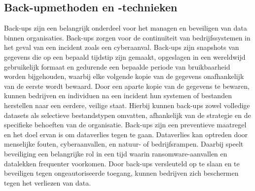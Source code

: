 \subsection{Back-upmethoden en -technieken}
Back-ups zijn een belangrijk onderdeel voor het managen en beveiligen van data binnen organisaties. Back-ups zorgen voor de continuïteit van bedrijfssystemen in het geval van een incident zoals een cyberaanval. Back-ups zijn snapshots van gegevens die op een bepaald tijdstip zijn gemaakt, opgeslagen in een wereldwijd gebruikelijk formaat en gedurende een bepaalde periode van bruikbaarheid worden bijgehouden, waarbij elke volgende kopie van de gegevens onafhankelijk van de eerste wordt bewaard\autocite{Nelson2011}. Door een aparte kopie van de gegevens te bewaren, kunnen bedrijven en individuen na een incident hun systemen of bestanden herstellen naar een eerdere, veilige staat. Hierbij kunnen back-ups zowel volledige datasets als selectieve bestandstypen omvatten, afhankelijk van de strategie en de specifieke behoeften van de organisatie. Back-ups zijn een preventieve maatregel en het doel ervan is om dataverlies tegen te gaan. Dataverlies kan optreden door menselijke fouten, cyberaanvallen, en natuur- of bedrijfsrampen. Daarbij speelt beveiliging een belangrijke rol in een tijd waarin ransomware-aanvallen en datalekken frequenter voorkomen. Door back-ups versleuteld op te slaan en te beveiligen tegen ongeautoriseerde toegang, kunnen bedrijven zich beschermen tegen het verliezen van data. 
